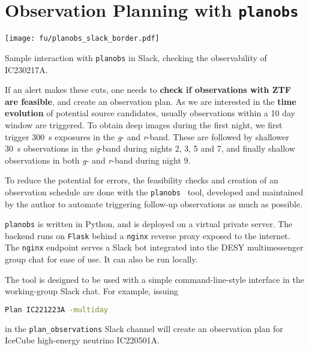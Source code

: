 \section{Observation Planning with \texttt{planobs}}\label{planobs}

\begin{marginfigure}
    \texttt{[image: fu/planobs\_slack\_border.pdf]}
    \caption[\texttt{planobs} Slack interaction]{Sample interaction with \texttt{planobs} in Slack, checking the observability of IC230217A.}
\end{marginfigure}

If an alert makes these cuts, one needs to \textbf{check if observations with ZTF are feasible}, and create an observation plan. As we are interested in the \textbf{time evolution} of potential source candidates, usually observations within a 10 day window are triggered. To obtain deep images during the first night, we first trigger \SI{300}{\second} exposures in the \textit{g}- and \textit{r}-band. These are followed by shallower \SI{30}{\second} observations in the \textit{g}-band during nights 2, 3, 5 and 7, and finally shallow observations in both \textit{g}- and \textit{r}-band during night 9.



To reduce the potential for errors, the feasibility checks and creation of an observation schedule are done with the \texttt{planobs}~ tool, developed and maintained by the author to automate triggering follow-up observations as much as possible.

\texttt{planobs} is written in Python, and is deployed on a virtual private server. The backend runs on \texttt{Flask} behind a \texttt{nginx} reverse proxy exposed to the internet. The \texttt{nginx} endpoint serves a Slack bot integrated into the DESY multimessenger group chat for ease of use. It can also be run locally.

The tool is designed to be used with a simple command-line-style interface in the working-group Slack chat. For example, issuing
\begin{lstlisting}[language=bash,style=kaolstplain]
Plan IC221223A -multiday
\end{lstlisting}
in the \texttt{plan\_observations} Slack channel will create an observation plan for IceCube high-energy neutrino IC220501A.

